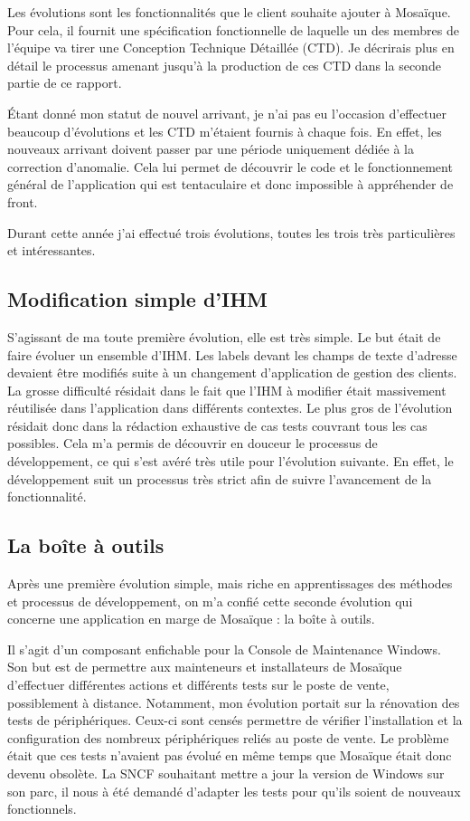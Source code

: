 Les évolutions sont les fonctionnalités que le client souhaite ajouter à Mosaïque. Pour cela, il fournit une spécification fonctionnelle de laquelle un des membres de l'équipe va tirer une Conception Technique Détaillée (CTD). Je décrirais plus en détail le processus amenant jusqu'à la production de ces CTD dans la seconde partie de ce rapport.

Étant donné mon statut de nouvel arrivant, je n'ai pas eu l'occasion d'effectuer beaucoup d'évolutions et les CTD m'étaient fournis à chaque fois. En effet, les nouveaux arrivant doivent passer par une période uniquement dédiée à la correction d'anomalie. Cela lui permet de découvrir le code et le fonctionnement général de l'application qui est tentaculaire et donc impossible à appréhender de front.

Durant cette année j'ai effectué trois évolutions, toutes les trois très particulières et intéressantes.

\subsection{Modification simple d'IHM}

    S'agissant de ma toute première évolution, elle est très simple. Le but était de faire évoluer un ensemble d'IHM. Les labels devant les champs de texte d'adresse devaient être modifiés suite à un changement d'application de gestion des clients. La grosse difficulté résidait dans le fait que l'IHM à modifier était massivement réutilisée dans l'application dans différents contextes. Le plus gros de l'évolution résidait donc dans la rédaction exhaustive de cas tests couvrant tous les cas possibles. Cela m'a permis de découvrir en douceur le processus de développement, ce qui s’est avéré très utile pour l'évolution suivante. En effet, le développement suit un processus très strict afin de suivre l'avancement de la fonctionnalité.

\subsection{La boîte à outils}

    Après une première évolution simple, mais riche en apprentissages des méthodes et processus de développement, on m'a confié cette seconde évolution qui concerne une application en marge de Mosaïque : la boîte à outils.
    
    Il s'agit d'un composant enfichable pour la Console de Maintenance Windows. Son but est de permettre aux mainteneurs et installateurs de Mosaïque d’effectuer différentes actions et différents tests sur le poste de vente, possiblement à distance. Notamment, mon évolution portait sur la rénovation des tests de périphériques. Ceux-ci sont censés permettre de vérifier l’installation et la configuration des nombreux périphériques reliés au poste de vente. Le problème était que ces tests n'avaient pas évolué en même temps que Mosaïque était donc devenu obsolète. La SNCF souhaitant mettre a jour la version de Windows sur son parc, il nous à été demandé d'adapter les tests pour qu'ils soient de nouveaux fonctionnels.
    
